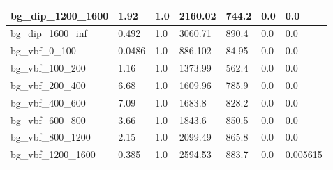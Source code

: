 \documentclass[a4paper, 10pt]{article}
\begin{document}
\begin{table}[H]
\begin{center}
\begin{tabular}{|m{23.0mm}|m{23.0mm}|m{18.0mm}|m{19.0mm}|m{19.0mm}|m{19.0mm}|m{19.0mm}|}
      \hline
      {\cellcolor{white}         bg\_dip\_1200\_1600}& {\cellcolor{white}         1.92}& {\cellcolor{white}         1.0}& {\cellcolor{white}         2160.02}& {\cellcolor{white}         744.2}& {\cellcolor{green}         0.0}& {\cellcolor{green}         0.0}\\
      \hline
      {\cellcolor{white}         bg\_dip\_1600\_inf}& {\cellcolor{white}         0.492}& {\cellcolor{white}         1.0}& {\cellcolor{white}         3060.71}& {\cellcolor{white}         890.4}& {\cellcolor{green}         0.0}& {\cellcolor{green}         0.0}\\
      \hline
      {\cellcolor{white}         bg\_vbf\_0\_100}& {\cellcolor{white}         0.0486}& {\cellcolor{white}         1.0}& {\cellcolor{white}         886.102}& {\cellcolor{white}         84.95}& {\cellcolor{green}         0.0}& {\cellcolor{green}         0.0}\\
      \hline
      {\cellcolor{white}         bg\_vbf\_100\_200}& {\cellcolor{white}         1.16}& {\cellcolor{white}         1.0}& {\cellcolor{white}         1373.99}& {\cellcolor{white}         562.4}& {\cellcolor{green}         0.0}& {\cellcolor{green}         0.0}\\
      \hline
      {\cellcolor{white}         bg\_vbf\_200\_400}& {\cellcolor{white}         6.68}& {\cellcolor{white}         1.0}& {\cellcolor{white}         1609.96}& {\cellcolor{white}         785.9}& {\cellcolor{green}         0.0}& {\cellcolor{green}         0.0}\\
      \hline
      {\cellcolor{white}         bg\_vbf\_400\_600}& {\cellcolor{white}         7.09}& {\cellcolor{white}         1.0}& {\cellcolor{white}         1683.8}& {\cellcolor{white}         828.2}& {\cellcolor{green}         0.0}& {\cellcolor{green}         0.0}\\
      \hline
      {\cellcolor{white}         bg\_vbf\_600\_800}& {\cellcolor{white}         3.66}& {\cellcolor{white}         1.0}& {\cellcolor{white}         1843.6}& {\cellcolor{white}         850.5}& {\cellcolor{green}         0.0}& {\cellcolor{green}         0.0}\\
      \hline
      {\cellcolor{white}         bg\_vbf\_800\_1200}& {\cellcolor{white}         2.15}& {\cellcolor{white}         1.0}& {\cellcolor{white}         2099.49}& {\cellcolor{white}         865.8}& {\cellcolor{green}         0.0}& {\cellcolor{green}         0.0}\\
      \hline
      {\cellcolor{white}         bg\_vbf\_1200\_1600}& {\cellcolor{white}         0.385}& {\cellcolor{white}         1.0}& {\cellcolor{white}         2594.53}& {\cellcolor{white}         883.7}& {\cellcolor{green}         0.0}& {\cellcolor{green}         0.005615}\\

\end{tabular}
\end{center}
\end{table}
\end{document}
